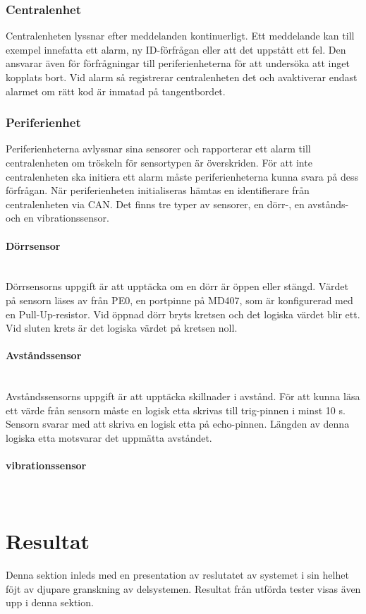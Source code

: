 \documentclass[a4paper]{article}
\newcommand{\subsubsubsection}[1]{\paragraph{#1}\mbox{}\\}
\begin{document}
\subsubsection{Centralenhet}
Centralenheten lyssnar efter meddelanden kontinuerligt.
Ett meddelande kan till exempel innefatta ett alarm, ny ID-förfrågan eller att det uppstått ett fel.
Den ansvarar även för förfrågningar till periferienheterna för att undersöka att inget kopplats bort.
Vid alarm så registrerar centralenheten det och avaktiverar endast alarmet om rätt kod är inmatad på tangentbordet.


\subsubsection{Periferienhet}
Periferienheterna avlyssnar sina sensorer och rapporterar ett alarm till centralenheten om tröskeln för sensortypen är överskriden.
För att inte centralenheten ska initiera ett alarm måste periferienheterna kunna svara på dess förfrågan.
När periferienheten initialiseras hämtas en identifierare från centralenheten via CAN. Det finns tre typer av sensorer, en dörr-, en avstånds- och en vibrationssensor.

\subsubsubsection{Dörrsensor}
Dörrsensorns uppgift är att upptäcka om en dörr är öppen eller stängd. Värdet på sensorn läses av från PE0, en portpinne på MD407, som är konfigurerad med en Pull-Up-resistor. Vid öppnad dörr bryts kretsen och det logiska värdet blir ett. Vid sluten krets är det logiska värdet på kretsen noll.

\subsubsubsection{Avståndssensor}
Avståndssensorns uppgift är att upptäcka skillnader i avstånd.
För att kunna läsa ett värde från sensorn måste en logisk etta skrivas till trig-pinnen i minst 10 \textmu s.
Sensorn svarar med att skriva en logisk etta på echo-pinnen.
Längden av denna logiska etta motsvarar det uppmätta avståndet.

\subsubsubsection{vibrationssensor}

\section{Resultat}
Denna sektion inleds med en presentation av reslutatet av systemet i sin helhet föjt av djupare granskning av delsystemen. Resultat från utförda tester visas även upp i denna sektion.
\end{document}
